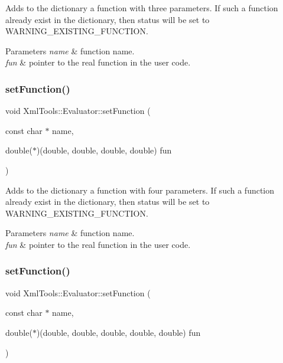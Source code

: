 Adds to the dictionary a function with three parameters. If such a function already exist in the dictionary, then status will be set to W\+A\+R\+N\+I\+N\+G\+\_\+\+E\+X\+I\+S\+T\+I\+N\+G\+\_\+\+F\+U\+N\+C\+T\+I\+ON.


\begin{DoxyParams}{Parameters}
{\em name} & function name. \\
\hline
{\em fun} & pointer to the real function in the user code. \\
\hline
\end{DoxyParams}
\hypertarget{class_xml_tools_1_1_evaluator_a7e77831c7bca5fd7bb81d31b657844d1}{}\label{class_xml_tools_1_1_evaluator_a7e77831c7bca5fd7bb81d31b657844d1} 
\subsubsection{\texorpdfstring{set\+Function()}{setFunction()}\hspace{0.1cm}{\footnotesize\ttfamily [5/6]}}
{\footnotesize\ttfamily void Xml\+Tools\+::\+Evaluator\+::set\+Function (\begin{DoxyParamCaption}\item[{const char $\ast$}]{name,  }\item[{double($\ast$)(double, double, double, double)}]{fun }\end{DoxyParamCaption})}

Adds to the dictionary a function with four parameters. If such a function already exist in the dictionary, then status will be set to W\+A\+R\+N\+I\+N\+G\+\_\+\+E\+X\+I\+S\+T\+I\+N\+G\+\_\+\+F\+U\+N\+C\+T\+I\+ON.


\begin{DoxyParams}{Parameters}
{\em name} & function name. \\
\hline
{\em fun} & pointer to the real function in the user code. \\
\hline
\end{DoxyParams}
\hypertarget{class_xml_tools_1_1_evaluator_ad4808f32cfac966a6ee400acaf7ff3ca}{}\label{class_xml_tools_1_1_evaluator_ad4808f32cfac966a6ee400acaf7ff3ca} 
\subsubsection{\texorpdfstring{set\+Function()}{setFunction()}\hspace{0.1cm}{\footnotesize\ttfamily [6/6]}}
{\footnotesize\ttfamily void Xml\+Tools\+::\+Evaluator\+::set\+Function (\begin{DoxyParamCaption}\item[{const char $\ast$}]{name,  }\item[{double($\ast$)(double, double, double, double, double)}]{fun }\end{DoxyParamCaption})}

